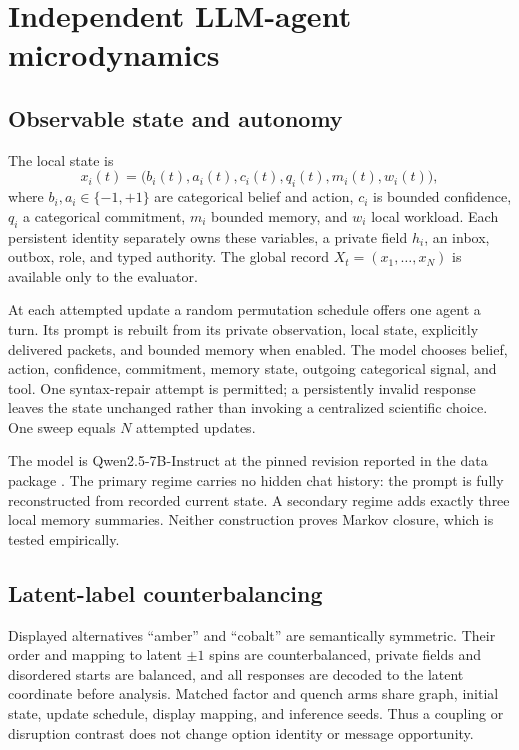 \documentclass[12pt]{article}
\begin{document}
\section{Independent LLM-agent microdynamics}

\subsection{Observable state and autonomy}

The local state is
\begin{equation}
x_i(t)=\bigl(b_i(t),a_i(t),c_i(t),q_i(t),m_i(t),w_i(t)\bigr),
\end{equation}
where $b_i,a_i\in\{-1,+1\}$ are categorical belief and action, $c_i$ is
bounded confidence, $q_i$ a categorical commitment, $m_i$ bounded memory, and
$w_i$ local workload. Each persistent identity separately owns these variables,
a private field $h_i$, an inbox, outbox, role, and typed authority. The global
record $X_t=(x_1,\ldots,x_N)$ is available only to the evaluator.

At each attempted update a random permutation schedule offers one agent a turn.
Its prompt is rebuilt from its private observation, local state, explicitly
delivered packets, and bounded memory when enabled. The model chooses belief,
action, confidence, commitment, memory state, outgoing categorical signal, and
tool. One syntax-repair attempt is permitted; a persistently invalid response
leaves the state unchanged rather than invoking a centralized scientific
choice. One sweep equals $N$ attempted updates.

The model is Qwen2.5-7B-Instruct at the pinned revision reported in the data
package \cite{qwen2024}. The primary regime carries no hidden chat history:
the prompt is fully reconstructed from recorded current state. A secondary
regime adds exactly three local memory summaries. Neither construction proves
Markov closure, which is tested empirically.

\subsection{Latent-label counterbalancing}

Displayed alternatives ``amber'' and ``cobalt'' are semantically symmetric.
Their order and mapping to latent $\pm1$ spins are counterbalanced, private
fields and disordered starts are balanced, and all responses are decoded to the
latent coordinate before analysis. Matched factor and quench arms share graph,
initial state, update schedule, display mapping, and inference seeds. Thus a
coupling or disruption contrast does not change option identity or message
opportunity.
\end{document}
